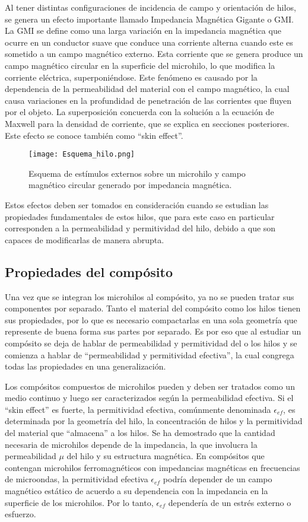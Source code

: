 \documentclass[12pt,letterpaper]{article}
\numberwithin{equation}{section}
\begin{document}
Al tener distintas configuraciones de incidencia de campo y orientación de hilos, se genera un efecto importante llamado Impedancia Magnética Gigante o GMI. La GMI se define como una larga variación en la impedancia magnética que ocurre en un conductor suave que conduce una corriente alterna cuando este es sometido a un campo magnético externo. Esta corriente que se genera produce un campo magnético circular en la superficie del microhilo, lo que modifica la corriente eléctrica, superponiéndose.
Este fenómeno es causado por la dependencia de la permeabilidad del material con el campo magnético, la cual causa variaciones en la profundidad de penetración de las corrientes que fluyen por el objeto. La superposición concuerda con la solución a la ecuación de Maxwell para la densidad de corriente, que se explica en secciones posteriores. Este efecto se conoce también como ``skin effect''.

\begin{figure}[H]
	\centering\texttt{[image: Esquema\_hilo.png]}\\
	\caption{Esquema de estímulos externos sobre un microhilo y campo magnético circular generado por impedancia magnética.}
	\label{fig:Esquema_hilo}
\end{figure} 


Estos efectos deben ser tomados en consideración cuando se estudian las propiedades fundamentales de estos hilos, que para este caso en particular corresponden a la permeabilidad y permitividad del hilo, debido a que son capaces de modificarlas de manera abrupta.

\subsection{Propiedades del compósito}

Una vez que se integran los microhilos al compósito, ya no se pueden tratar sus componentes por separado. Tanto el material del compósito como los hilos tienen sus propiedades, por lo que es necesario compactarlas en una sola geometría que represente de buena forma sus partes por separado. Es por eso que al estudiar un compósito se deja de hablar de permeabilidad y permitividad del o los hilos y se comienza a hablar de ``permeabilidad y permitividad efectiva'', la cual congrega todas las propiedades en una generalización.

Los compósitos compuestos de microhilos pueden y deben ser tratados como un medio continuo y luego ser caracterizados según la permeabilidad efectiva. Si el ``skin effect'' es fuerte, la permitividad efectiva, comúnmente denominada $\epsilon_{ef}$, es determinada por la geometría del hilo, la concentración de hilos y la permitividad del material que ``almacena'' a los hilos. Se ha demostrado que la cantidad necesaria de microhilos depende de la impedancia, la que involucra la permeabilidad $\mu$ del hilo y su estructura magnética. En compósitos que contengan microhilos ferromagnéticos con impedancias magnéticas en frecuencias de microondas, la permitividad efectiva $\epsilon_{ef}$ podría depender de un campo magnético estático de acuerdo a su dependencia con la impedancia en la superficie de los microhilos. Por lo tanto, $\epsilon_{ef}$ dependería de un estrés externo o esfuerzo.
\end{document}
